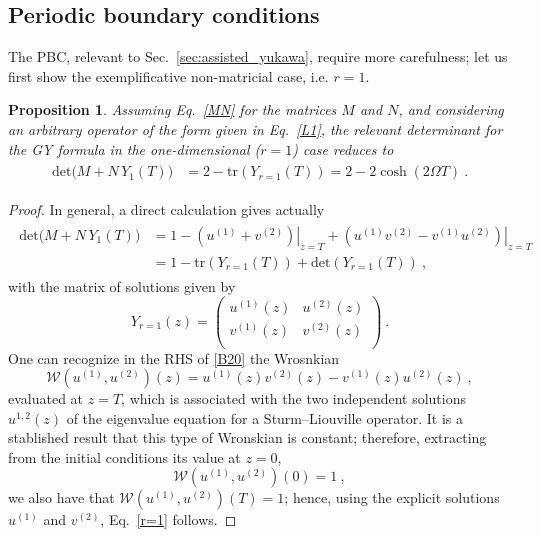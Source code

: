 \documentclass[12pt,a4paper]{article}
\numberwithin{equation}{section}
\numberwithin{equation}{section}
\begin{document}
\subsection{Periodic boundary conditions} \label{app:det_pbc}

The PBC, relevant to Sec.~\ref{sec:assisted_yukawa}, require more carefulness; let us first show the exemplificative non-matricial case, i.e. $r=1$. 

\newtheorem{theorem}{Theorem}
\newtheorem{proposition}{Proposition} 

\begin{proposition}

Assuming Eq.~\eqref{MN} for the matrices $M$ and $N$, and considering an arbitrary operator of the form given in Eq.~\eqref{L1}, the relevant determinant for the GY formula in the one-dimensional ($r=1$) case reduces to
\begin{align}
\begin{split} \label{r=1}
\mathrm{det}\Big(M+N \, Y_1(T)\Big)
&=2-\mathrm{tr}\left(Y_{r=1}(T)\right)
= 2-2\cosh(2\Omega T) \ .
\end{split}
\end{align}
\end{proposition}

\begin{proof}
In general, a direct calculation gives actually
\begin{align}
\begin{split}
\mathrm{det}\Big(M+N \, Y_1(T)\Big)&=1-\left.\left( u^{(1)}+v^{(2)} \right)\right|_{z=T}+\left.(u^{(1)}v^{(2)}-v^{(1)}u^{(2)})\right|_{z=T} \label{B20} \\
&=1- \mathrm{tr}\left(Y_{r=1}(T) \right)+\mathrm{det}\left( Y_{r=1} (T)\right)\ ,
\end{split}
\end{align}
with the matrix of solutions given by
\begin{equation}
Y_{r=1}(z)=\left(
\begin{array}{cc} u^{(1)}(z) & u^{(2)}(z) \\ v^{(1)}(z) & v^{(2)}(z) \\
\end{array}\right)\ .
\end{equation}
One can recognize in the RHS of \eqref{B20} the Wrosnkian
\begin{equation}
\mathcal{W}(u^{(1)},u^{(2)})(z)=u^{(1)}(z)v^{(2)}(z)-v^{(1)}(z)u^{(2)}(z)\ ,
\end{equation}
evaluated at $z=T$, which is associated with the two independent solutions $u^{1,2}(z)$ of the eigenvalue equation for a Sturm--Liouville operator.
It is a stablished result that this type of Wronskian is constant;
therefore, extracting from the initial conditions its value at $z=0$,
\begin{equation}
\mathcal{W}(u^{(1)},u^{(2)})(0)=1\ ,
\end{equation}
we also have that $\mathcal{W}(u^{(1)},u^{(2)})(T)=1$; hence, using the explicit solutions $u^{(1)}$ and $v^{(2)}$, Eq.~\eqref{r=1} follows.
\end{proof}
\end{document}

